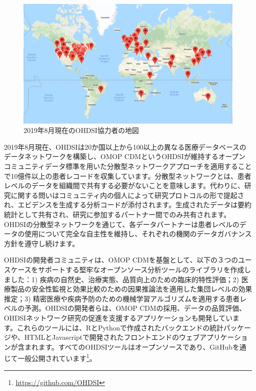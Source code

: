 \documentclass[
  11pt]{book}
\theoremstyle{definition}
\theoremstyle{definition}
\theoremstyle{definition}
\theoremstyle{definition}
\theoremstyle{remark}
\begin{document}
\begin{figure}

{\centering \includegraphics[width=1\linewidth]{images/OhdsiCommunity/mapOfCollaborators} 

}

\caption{2019年8月現在のOHDSI協力者の地図}\label{fig:collaboratormap}
\end{figure}

2019年8月現在、OHDSIは20か国以上から100以上の異なる医療データベースのデータネットワークを構築し、OMOP CDMというOHDSIが維持するオープンコミュニティデータ標準を用いた分散型ネットワークアプローチを適用することで10億件以上の患者レコードを収集しています。分散型ネットワークとは、患者レベルのデータを組織間で共有する必要がないことを意味します。代わりに、研究に関する問いはコミュニティ内の個人によって研究プロトコルの形で提起され、エビデンスを生成する分析コードが添付されます。生成されたデータは要約統計として共有され、研究に参加するパートナー間でのみ共有されます。OHDSIの分散型ネットワークを通じて、各データパートナーは患者レベルのデータの使用について完全な自主性を維持し、それぞれの機関のデータガバナンス方針を遵守し続けます。

OHDSIの開発者コミュニティは、OMOP CDMを基盤として、以下の３つのユースケースをサポートする堅牢なオープンソース分析ツールのライブラリを作成しました：1) 疾病の自然史、治療実態、品質向上のための臨床的特性評価；2) 医療製品の安全性監視と効果比較のための因果推論法を適用した集団レベルの効果推定；3) 精密医療や疾病予防のための機械学習アルゴリズムを適用する患者レベルの予測。OHDSIの開発者らは、OMOP CDMの採用、データの品質評価、OHDSIネットワーク研究の促進を支援するアプリケーションも開発しています。これらのツールには、RとPythonで作成されたバックエンドの統計パッケージや、HTMLとJavascriptで開発されたフロントエンドのウェブアプリケーションが含まれます。すべてのOHDSIツールはオープンソースであり、GitHubを通じて一般公開されています\footnote{\url{https://github.com/OHDSI}}。
\end{document}
